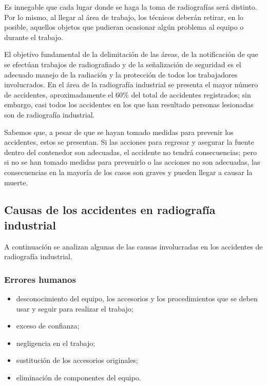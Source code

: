 Es innegable que cada lugar donde se haga la toma de radiografías será distinto. Por lo mismo, al llegar al área de trabajo, los técnicos deberán retirar, en lo posible, aquellos objetos que pudieran ocasionar algún problema al equipo o durante el trabajo.

El objetivo fundamental de la delimitación de las áreas, de la notificación de que se efectúan trabajos de radiografiado y de la señalización de seguridad es el adecuado manejo de la radiación y la protección de todos los trabajadores involucrados. En el área de la radiografía industrial se presenta el mayor número de accidentes, aproximadamente el 60\% del total de accidentes registrados; sin embargo, casi todos los accidentes en los que han resultado personas lesionadas son de radiografía industrial.

Sabemos que, a pesar de que se hayan tomado medidas para prevenir los accidentes, estos se presentan. Si las acciones para regresar y asegurar la fuente dentro del contenedor son adecuadas, el accidente no tendrá consecuencias; pero si no se han tomado medidas para prevenirlo o las acciones no son adecuadas, las consecuencias en la mayoría de los casos son graves y pueden llegar a causar la muerte.

\subsection{Causas de los accidentes en radiografía industrial}

A continuación se analizan algunas de las causas involucradas en los accidentes de radiografía industrial.

\subsubsection{Errores humanos}
\begin{itemize}
  \item desconocimiento del equipo, los accesorios y los procedimientos que se deben usar y seguir para realizar el trabajo;
  \item exceso de confianza;
  \item negligencia en el trabajo;
  \item sustitución de los accesorios originales;
  \item eliminación de componentes del equipo.
\end{itemize}

